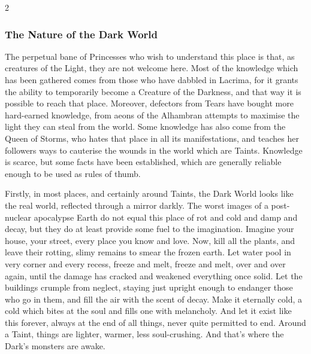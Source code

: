 \begin{multicols}{2}
\subsubsection*{The Nature of the Dark World}
The perpetual bane of Princesses who wish to understand this place is that, as creatures of the Light, they are not welcome here. Most of the knowledge which has been gathered comes from those who have dabbled in Lacrima, for it grants the ability to temporarily become a Creature of the Darkness, and that way it is possible to reach that place. Moreover, defectors from Tears have bought more hard-earned knowledge, from aeons of the Alhambran attempts to maximise the light they can steal from the world. Some knowledge has also come from the Queen of Storms, who hates that place in all its manifestations, and teaches her followers ways to cauterise the wounds in the world which are Taints. Knowledge is scarce, but some facts have been established, which are generally reliable enough to be used as rules of thumb.

Firstly, in most places, and certainly around Taints, the Dark World looks like the real world, reflected through a mirror darkly. The worst images of a post-nuclear apocalypse Earth do not equal this place of rot and cold and damp and decay, but they do at least provide some fuel to the imagination. Imagine your house, your street, every place you know and love. Now, kill all the plants, and leave their rotting, slimy remains to smear the frozen earth. Let water pool in very corner and every recess, freeze and melt, freeze and melt, over and over again, until the damage has cracked and weakened everything once solid. Let the buildings crumple from neglect, staying just upright enough to endanger those who go in them, and fill the air with the scent of decay. Make it eternally cold, a cold which bites at the soul and fills one with melancholy. And let it exist like this forever, always at the end of all things, never quite permitted to end. Around a Taint, things are lighter, warmer, less soul-crushing. And 
that's where the Dark's monsters are awake.


\end{multicols}
